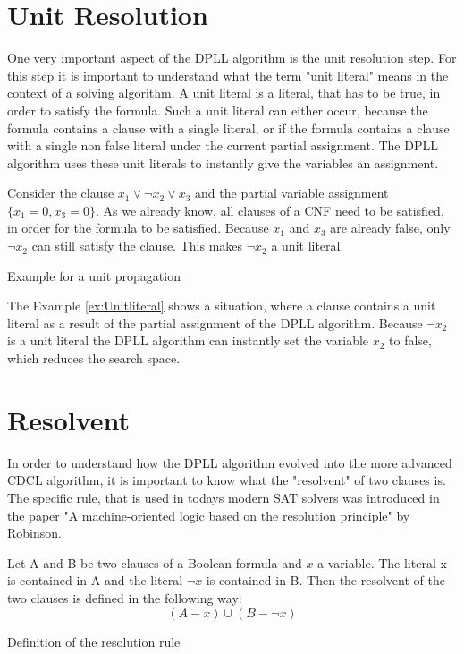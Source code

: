 \section{Unit Resolution}
One very important aspect of the DPLL algorithm is the unit resolution step. For this step it is important to understand what the term "unit literal" means in the context of a solving algorithm. A unit literal is a literal, that has to be true, in order to satisfy the formula. Such a unit literal can either occur, because the formula contains a clause with a single literal, or if the formula contains a clause with a single non false literal under the current partial assignment. The DPLL algorithm uses these unit literals to instantly give the variables an assignment. \cite{biere2009handbook}

\begin{example}
\begin{leftbar}
Consider the clause $x_1 \vee \neg x_2 \vee x_3$ and the partial variable assignment $\{x_1=0,x_3=0\}$. As we already know, all clauses of a CNF need to be satisfied, in order for the formula to be satisfied. Because $x_1$ and $x_3$ are already false, only $\neg x_2$ can still satisfy the clause. This makes $\neg x_2$ a unit literal.
\end{leftbar}
\caption{Example for a unit propagation}
\label{ex:Unitliteral}
\end{example}

The Example \ref{ex:Unitliteral} shows a situation, where a clause contains a unit literal as a result of the partial assignment of the DPLL algorithm. Because $\neg x_2$ is a unit literal the DPLL algorithm can instantly set the variable $x_2$ to false, which reduces the search space.

\section{Resolvent}
In order to understand how the DPLL algorithm evolved into the more advanced CDCL algorithm, it is important to know what the "resolvent" of two clauses is. The specific rule, that is used in todays modern SAT solvers was introduced in the paper "A machine-oriented logic based on the resolution principle" \cite{robinson1965machine} by Robinson.

\begin{definition}
\begin{leftbar}
Let A and B be two clauses of a Boolean formula and $x$ a variable. The literal x is contained in A and the literal $\neg x$ is contained in B. Then the resolvent of the two clauses is defined in the following way:
\begin{displaymath}
(A - x) \cup (B - \neg x)
\end{displaymath}
\end{leftbar}
\caption{Definition of the resolution rule \cite{robinson1965machine}}
\label{def:Resolution}
\end{definition}

